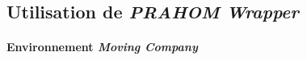 \documentclass[demonstration]{jfsma}
\newcommand{\probP}{\text{I\kern-0.15em P}}
\begin{document}









\subsection{Utilisation de \emph{PRAHOM Wrapper}}

\paragraph{Environnement \emph{Moving Company}}
\end{document}
